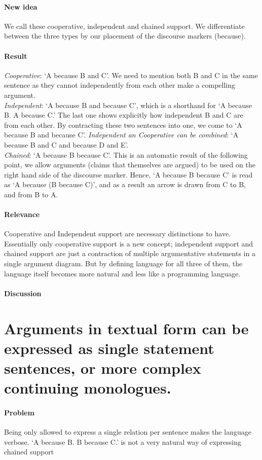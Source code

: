 \documentclass{article}
\let\stdsection\section
\renewcommand\section{\newpage\stdsection}
\begin{document}
\paragraph{New idea} We call these cooperative, independent and chained support. We differentiate between the three types by our placement of the discourse markers (because).
\paragraph{Result}
\emph{Cooperative}: `A because B and C'. We need to mention both B and C in the same sentence as they cannot independently from each other make a compelling argument.\\
\emph{Independent}: `A because B and because C', which is a shorthand for `A because B. A because C.' The last one shows explicitly how independent B and C are from each other. By contracting these two sentences into one, we come to `A because B and because C'. \emph{Independent an Cooperative can be combined}: `A because B and C and because D and E'.\\
\emph{Chained}: `A because B because C'. This is an automatic result of the following point, we allow arguments (claims that themselves are argued) to be used on the right hand side of the discourse marker. Hence, `A because B because C' is read as `A because (B because C)', and as a result an arrow is drawn from C to B, and from B to A.
\paragraph{Relevance} Cooperative and Independent support are necessary distinctions to have. Essentially only cooperative support is a new concept; independent support and chained support are just a contraction of multiple argumentative statements in a single argument diagram. But by defining language for all three of them, the language itself becomes more natural and less like a programming language.
\paragraph{Discussion} 

\section{Arguments in textual form can be expressed as single statement sentences, or more complex continuing monologues.}

\paragraph{Problem} Being only allowed to express a single relation per sentence makes the language verbose. `A because B. B because C.' is not a very natural way of expressing chained support
\end{document}
